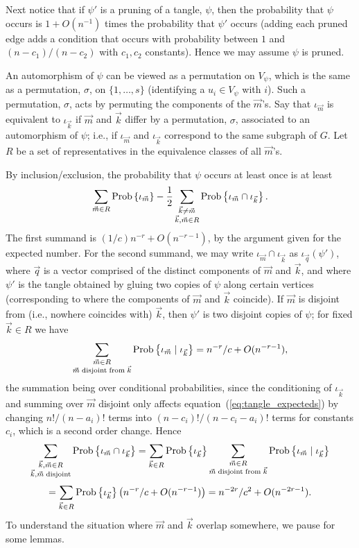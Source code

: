 \documentclass[12pt]{article}
\newcommand{\tang}{{\psi}}	%
\newcommand{\prob}[1]{{\rm Prob}\left\{ #1 \right\} }
\begin{document}
Next notice that if $\tang'$ is a pruning of a tangle, $\tang$, then
the probability that $\tang$ occurs is $1+O(n^{-1})$ times the probability
that $\tang'$ occurs (adding each pruned edge adds a condition that occurs
with probability between $1$ and $(n-c_1)/(n-c_2)$ with $c_1,c_2$
constants).  Hence we may assume $\tang$ is pruned.

An automorphism of $\tang$ can be viewed as a permutation on
$V_\tang$, which is the same as a permutation, $\sigma$, on
$\{1,\ldots,s\}$ (identifying a $u_i\in V_\tang$ with $i$).
Such a permutation, $\sigma$, acts by permuting the components
of the $\vec m$'s.  Say that $\iota_{\vec m}$ is equivalent to
$\iota_{\vec k}$ if $\vec m$ and $\vec k$ differ by a permutation,
$\sigma$, associated to an automorphism of $\tang$; i.e., if
$\iota_{\vec m}$ and $\iota_{\vec k}$ correspond to the same subgraph
of $G$.  Let $R$ be a set
of representatives in the equivalence classes of all $\vec m$'s.

By inclusion/exclusion, the probability that $\tang$ occurs at least once is
at least
\begin{equation}\label{eq:incexc}
\sum_{{\vec m}\in R} \prob{\iota_{\vec m}} - 
\frac{1}{2}\sum_{\substack{ {\vec k}\ne {\vec m} \\ {\vec k},{\vec m}\in R}}
\prob{\iota_{\vec m}\cap\iota_{\vec k}}.
\end{equation}
The first summand is $(1/c)n^{-r}+O(n^{-r-1})$, by the argument given
for the expected number.  For the second summand, we may write
$\iota_{\vec m}\cap\iota_{\vec k}$ as $\iota_{\vec q}(\tang')$, where
$\vec q$ is a vector comprised of the
distinct components of $\vec m$ and $\vec k$, and where $\tang'$ is the tangle
obtained by gluing two copies of $\tang$ along certain vertices (corresponding
to where the components of $\vec m$ and $\vec k$ coincide).  If 
$\vec m$ is disjoint from (i.e., nowhere coincides with)
$\vec k$, then $\tang'$ is two disjoint
copies of $\tang$; for fixed $\vec k\in R$ we have
$$
\sum_{\substack{ {\vec m}\in R\\ {\vec m}\;{\rm disjoint\;from\;}\vec k}}
\prob{\iota_{\vec m}\;|\;\iota_{\vec k}} = n^{-r}/c + O(n^{-r-1}),
$$
the summation being over conditional probabilities, since the conditioning
of $\iota_{\vec k}$ and summing over $\vec m$ disjoint only affects
equation~(\ref{eq:tangle_expecteds}) by changing $n!/(n-a_i)!$ terms
into $(n-c_i)!/(n-c_i-a_i)!$ terms for constants $c_i$, which is a
second order change.
Hence
$$
\sum_{\substack{{\vec k},{\vec m}\in R \\ {\vec k},{\vec m}\;{\rm disjoint}}}
\prob{\iota_{\vec m}\cap\iota_{\vec k}}
=
\sum_{ \vec k\in R} \prob{\iota_{\vec k}}
\sum_{\substack{ {\vec m}\in R\\ {\vec m}\;{\rm disjoint\;from\;}\vec k}}
\prob{\iota_{\vec m}\;|\;\iota_{\vec k}}
$$
$$
= \sum_{ \vec k\in R} \prob{\iota_{\vec k}} \bigl( n^{-r}/c + O(n^{-r-1})
\bigr)
= n^{-2r}/c^2 + O(n^{-2r-1}).
$$
To understand the situation where $\vec m$ and $\vec k$ overlap somewhere,
we pause for some lemmas.
\end{document}
